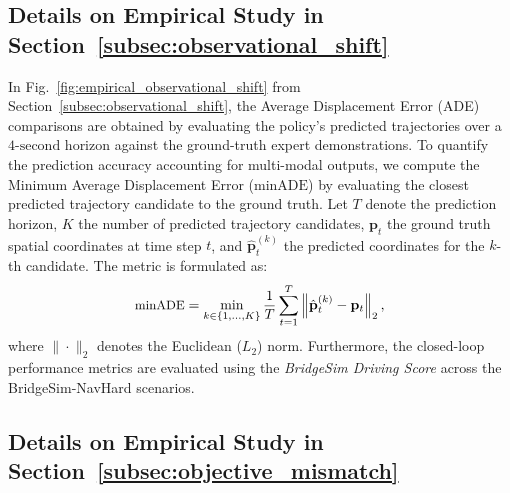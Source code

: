 \documentclass{article}
\begin{document}
\subsection{Details on Empirical Study in Section~\ref{subsec:observational_shift}}
\label{appendix:observational_shift_details}

In Fig.~\ref{fig:empirical_observational_shift} from Section~\ref{subsec:observational_shift}, the Average Displacement Error (ADE) comparisons are obtained by evaluating the policy's predicted trajectories over a $4\text{-second}$ horizon against the ground-truth expert demonstrations. To quantify the prediction accuracy accounting for multi-modal outputs, we compute the Minimum Average Displacement Error ($\text{minADE}$) by evaluating the closest predicted trajectory candidate to the ground truth. Let $T$ denote the prediction horizon, $K$ the number of predicted trajectory candidates, $\mathbf{p}_t$ the ground truth spatial coordinates at time step $t$, and $\hat{\mathbf{p}}_t^{(k)}$ the predicted coordinates for the $k$-th candidate. The metric is formulated as:
\begin{equation}
\small
    \text{minADE} = \min_{k \in \{1, \dots, K\}} \frac{1}{T} \sum_{t=1}^{T} \left\| \hat{\mathbf{p}}_t^{(k)} - \mathbf{p}_t \right\|_2,
\end{equation}
where $\| \cdot \|_2$ denotes the Euclidean ($L_2$) norm. Furthermore, the closed-loop performance metrics are evaluated using the \textit{BridgeSim Driving Score} across the BridgeSim-NavHard scenarios.

\subsection{Details on Empirical Study in Section~\ref{subsec:objective_mismatch}}
\label{appendix:objective_mismatch_details}
\end{document}
